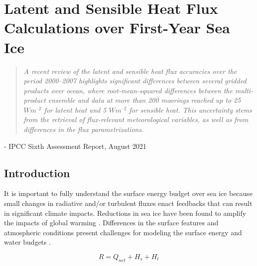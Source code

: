 \chapter{Latent and Sensible Heat Flux Calculations over First-Year Sea Ice}
\vspace{1 cm}
\begin{spacing}{1} \begin{quote} 
\noindent \emph{A recent review of the latent and sensible heat flux accuracies over the period 2000–2007 highlights significant differences between several gridded products over ocean, where root-mean-squared differences between the multi-product ensemble and data at more than 200  moorings reached up to 25 $W m^{–2}$ for latent heat and 5 $W m^{–2}$ for sensible heat. This uncertainty stems from the retrieval of flux-relevant meteorological variables, as well as from differences in the flux parametrizations.} \end{quote}
\hspace{6 cm} - IPCC Sixth Assessment Report, August 2021  
\end{spacing}
\doublespacing
\section{Introduction}

It is important to fully understand the surface energy budget over sea ice because small changes in radiative and/or turbulent fluxes enact feedbacks that can result in significant climate impacts. Reductions in sea ice have been found to amplify the impacts of global warming \citep{wunderling:2020, ipcc_techsum}. Differences in the surface features and atmospheric conditions present challenges for modeling the surface energy and water budgets \citep{wang:2009}. 

\begin{equation}\label{eq:seb}
R = Q_{net} + H_{s} + H_{l}
\end{equation}

